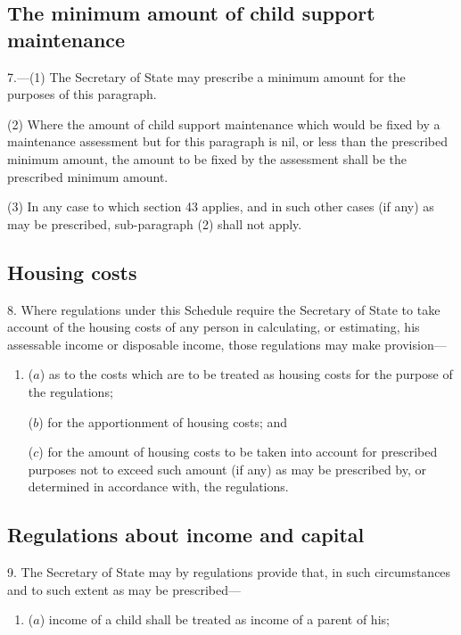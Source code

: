 \documentclass[a4paper]{article}
\begin{document}
{\subsection*{The minimum amount of child support maintenance}

7.---(1) The Secretary of State may prescribe a minimum amount for the purposes of this paragraph.

(2) Where the amount of child support maintenance which would be fixed by a maintenance assessment but for this paragraph is nil, or less than the prescribed minimum amount, the amount to be fixed by the assessment shall be the prescribed minimum amount.

(3) In any case to which section 43 applies, and in such other cases (if any) as may be prescribed, sub-paragraph (2) shall not apply.

\subsection*{Housing costs}

8. Where regulations under this Schedule require the Secretary of State to take account of the housing costs of any person in calculating, or estimating, his assessable income or disposable income, those regulations may make provision---
\begin{enumerate}\item[]
($a$) as to the costs which are to be treated as housing costs for the purpose of the regulations;

($b$) for the apportionment of housing costs; and

($c$) for the amount of housing costs to be taken into account for prescribed purposes not to exceed such amount (if any) as may be prescribed by, or determined in accordance with, the regulations.
\end{enumerate}


\subsection*{Regulations about income and capital}

9. The Secretary of State may by regulations provide that, in such circumstances and to such extent as may be prescribed---
\begin{enumerate}\item[]
($a$) income of a child shall be treated as income of a parent of his;


\end{enumerate}}
\end{document}
